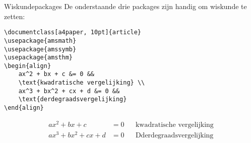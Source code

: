 \begin{frame}[fragile]{Wiskundepackages}
De onderstaande drie packages zijn handig om wiskunde te zetten:
\begin{verbatim}
\documentclass[a4paper, 10pt]{article}
\usepackage{amsmath}
\usepackage{amssymb}
\usepackage{amsthm}
\begin{align}
    ax^2 + bx + c &= 0 && 
    \text{kwadratische vergelijking} \\
    ax^3 + bx^2 + cx + d &= 0 && 
    \text{derdegraadsvergelijking}
\end{align} 
\end{verbatim}
\begin{tcolorbox}[width=11cm,fontupper=\footnotesize, fontlower=\footnotesize]
\begin{align*}
    ax^2 + bx + c &= 0 && 
    \text{kwadratische vergelijking} \\
    ax^3 + bx^2 + cx + d &= 0 && 
    \text{Dderdegraadsvergelijking}
\end{align*} 
\end{tcolorbox}

\end{frame}